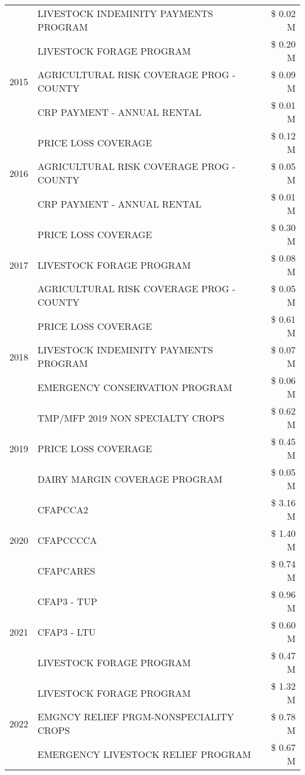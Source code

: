\begin{tabular}{llr}
 & LIVESTOCK INDEMINITY PAYMENTS PROGRAM & \$ 0.02 M \\
\cline{1-3}
\multirow[t]{3}{*}{2015} & LIVESTOCK FORAGE PROGRAM & \$ 0.20 M \\
 & AGRICULTURAL RISK COVERAGE PROG - COUNTY & \$ 0.09 M \\
 & CRP PAYMENT - ANNUAL RENTAL & \$ 0.01 M \\
\cline{1-3}
\multirow[t]{3}{*}{2016} & PRICE LOSS COVERAGE & \$ 0.12 M \\
 & AGRICULTURAL RISK COVERAGE PROG - COUNTY & \$ 0.05 M \\
 & CRP PAYMENT - ANNUAL RENTAL & \$ 0.01 M \\
\cline{1-3}
\multirow[t]{3}{*}{2017} & PRICE LOSS COVERAGE & \$ 0.30 M \\
 & LIVESTOCK FORAGE PROGRAM & \$ 0.08 M \\
 & AGRICULTURAL RISK COVERAGE PROG - COUNTY & \$ 0.05 M \\
\cline{1-3}
\multirow[t]{3}{*}{2018} & PRICE LOSS COVERAGE & \$ 0.61 M \\
 & LIVESTOCK INDEMINITY PAYMENTS PROGRAM & \$ 0.07 M \\
 & EMERGENCY CONSERVATION PROGRAM & \$ 0.06 M \\
\cline{1-3}
\multirow[t]{3}{*}{2019} & TMP/MFP 2019 NON SPECIALTY CROPS & \$ 0.62 M \\
 & PRICE LOSS COVERAGE & \$ 0.45 M \\
 & DAIRY MARGIN COVERAGE PROGRAM & \$ 0.05 M \\
\cline{1-3}
\multirow[t]{3}{*}{2020} & CFAPCCA2 & \$ 3.16 M \\
 & CFAPCCCCA & \$ 1.40 M \\
 & CFAPCARES & \$ 0.74 M \\
\cline{1-3}
\multirow[t]{3}{*}{2021} & CFAP3 - TUP & \$ 0.96 M \\
 & CFAP3 - LTU & \$ 0.60 M \\
 & LIVESTOCK FORAGE PROGRAM & \$ 0.47 M \\
\cline{1-3}
\multirow[t]{3}{*}{2022} & LIVESTOCK FORAGE PROGRAM & \$ 1.32 M \\
 & EMGNCY RELIEF PRGM-NONSPECIALITY CROPS & \$ 0.78 M \\
 & EMERGENCY LIVESTOCK RELIEF PROGRAM & \$ 0.67 M \\
\cline{1-3}
\bottomrule
\end{tabular}
